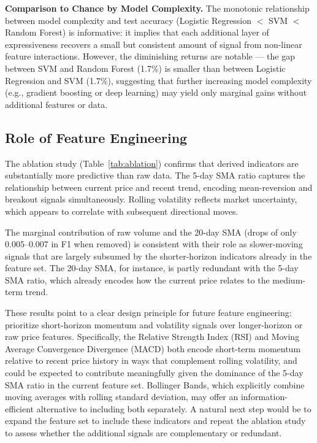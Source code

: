 \documentclass{article}
\begin{document}
\textbf{Comparison to Chance by Model Complexity.} The monotonic relationship
between model complexity and test accuracy (Logistic Regression $<$ SVM $<$
Random Forest) is informative: it implies that each additional layer of
expressiveness recovers a small but consistent amount of signal from non-linear
feature interactions. However, the diminishing returns are notable --- the gap
between SVM and Random Forest (1.7\%) is smaller than between Logistic
Regression and SVM (1.7\%), suggesting that further increasing model complexity
(e.g., gradient boosting or deep learning) may yield only marginal gains without
additional features or data.

\subsection{Role of Feature Engineering}

The ablation study (Table~\ref{tab:ablation}) confirms that derived indicators
are substantially more predictive than raw data. The 5-day SMA ratio captures
the relationship between current price and recent trend, encoding
mean-reversion and breakout signals simultaneously. Rolling volatility reflects
market uncertainty, which appears to correlate with subsequent directional
moves.

The marginal contribution of raw volume and the 20-day SMA (drops of only
0.005--0.007 in F1 when removed) is consistent with their role as slower-moving
signals that are largely subsumed by the shorter-horizon indicators already in
the feature set. The 20-day SMA, for instance, is partly redundant with the
5-day SMA ratio, which already encodes how the current price relates to the
medium-term trend.

These results point to a clear design principle for future feature engineering:
prioritize short-horizon momentum and volatility signals over longer-horizon or
raw price features. Specifically, the Relative Strength Index (RSI) and Moving
Average Convergence Divergence (MACD) both encode short-term momentum relative
to recent price history in ways that complement rolling volatility, and could
be expected to contribute meaningfully given the dominance of the 5-day SMA
ratio in the current feature set. Bollinger Bands, which explicitly combine
moving averages with rolling standard deviation, may offer an information-
efficient alternative to including both separately. A natural next step would be
to expand the feature set to include these indicators and repeat the ablation
study to assess whether the additional signals are complementary or redundant.
\end{document}
